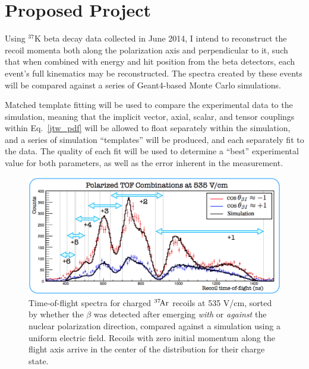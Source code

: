 
\section{Proposed Project}
\label{project}
Using $^{37}\textrm{K}$ beta decay data collected in June 2014, I intend to reconstruct the recoil momenta both along the polarization axis and perpendicular to it, such that when combined with energy and hit position from the beta detectors, each event's full kinematics may be reconstructed.  The spectra created by these events will be compared against a series of Geant4-based Monte Carlo simulations.  

Matched template fitting will be used to compare the experimental data to the simulation, meaning that the implicit vector, axial, scalar, and tensor couplings within Eq.~\ref{jtw_pdf} will be allowed to float separately within the simulation, and a series of simulation ``templates'' will be produced, and each separately fit to the data.  The quality of each fit will be used to determine a ``best'' experimental value for both parameters, as well as the error inherent in the measurement.  

\begin{figure}[h!!t]
	\centering
	\includegraphics[width=.999\linewidth]
	{Figures/Rslow_tof_squished.png}
	\caption{Time-of-flight spectra for charged $^{37}\textrm{\!Ar}$ recoils at 535 V/cm, sorted by whether the $\beta$ was detected after emerging \emph{with} or \emph{against} the nuclear polarization direction, compared against a simulation using a uniform electric field.  	Recoils with zero initial momentum along the flight axis arrive in the center of the distribution for their charge state.  
	}	
	\label{fig:Rslow_tof}
\end{figure}

